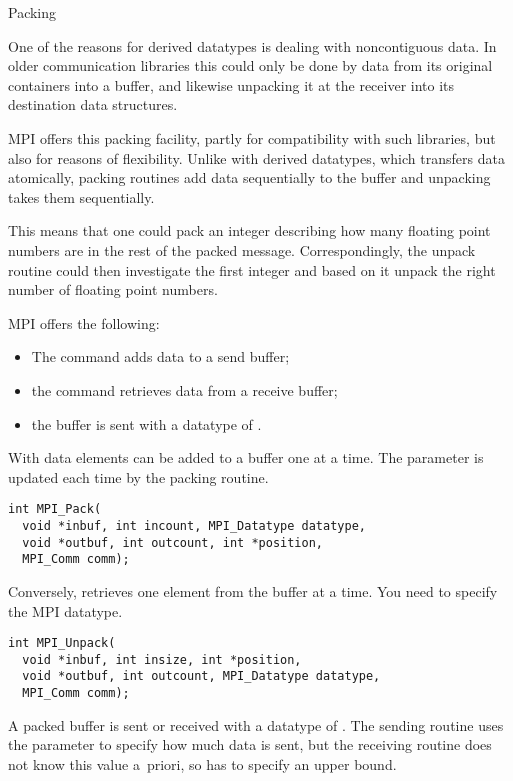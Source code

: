 
 {Packing}
\label{sec:pack}

One of the reasons for derived datatypes is dealing with noncontiguous data.
In older communication libraries this could only be done by  data
from its original containers into a buffer, and likewise unpacking it at the
receiver into its destination data structures.

MPI offers this packing facility, partly for compatibility with such libraries,
but also for reasons of flexibility. Unlike with derived datatypes,
which transfers data atomically, packing routines add data sequentially
to the buffer and unpacking takes them sequentially. 

This means that 
one could pack an integer describing how many floating point numbers
are in the rest of the packed message. 
Correspondingly, the unpack routine could then investigate the first integer
and based on it unpack the right number of floating point numbers.

MPI offers the following:
\begin{itemize}
\item The  command adds data to a send buffer;
\item the  command retrieves data from a receive buffer;
\item the buffer is sent with a datatype of .
\end{itemize}

With  data elements can be added 
to a buffer one at a time. The  parameter is updated
each time by the packing routine.
\begin{lstlisting}
int MPI_Pack(
  void *inbuf, int incount, MPI_Datatype datatype,
  void *outbuf, int outcount, int *position,
  MPI_Comm comm);
\end{lstlisting}

Conversely,  retrieves one element
from the buffer at a time. You need to specify the MPI datatype.
\begin{lstlisting}
int MPI_Unpack(
  void *inbuf, int insize, int *position,
  void *outbuf, int outcount, MPI_Datatype datatype,
  MPI_Comm comm);
\end{lstlisting}

A packed buffer is sent or received with a datatype of
. The sending routine uses the 
parameter to specify how much data is sent, but the receiving routine
does not know this value a~priori, so has to specify an upper bound.

